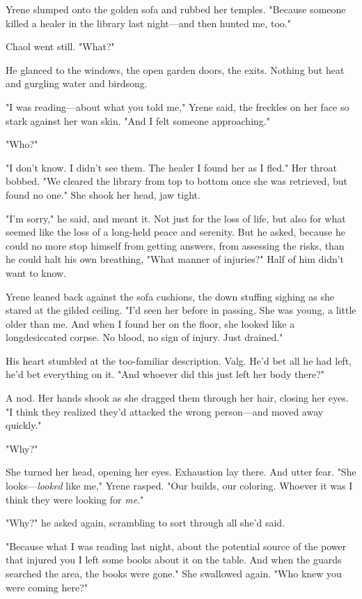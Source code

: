 Yrene slumped onto the golden sofa and rubbed her temples. "Because someone killed a healer in the library last night---and then hunted me, too."

Chaol went still. "What?"

He glanced to the windows, the open garden doors, the exits. Nothing but heat and gurgling water and birdsong.

"I was reading---about what you told me," Yrene said, the freckles on her face so stark against her wan skin. "And I felt someone approaching."

"Who?"

"I don't know. I didn't see them. The healer  I found her as I fled." Her throat bobbed. "We cleared the library from top to bottom once she was  retrieved, but found no one." She shook her head, jaw tight.

"I'm sorry," he said, and meant it. Not just for the loss of life, but also for what seemed like the loss of a long-held peace and serenity. But he asked, because he could no more stop himself from getting answers, from assessing the risks, than he could halt his own breathing, "What manner of injuries?" Half of him didn't want to know.

Yrene leaned back against the sofa cushions, the down stuffing sighing as she stared at the gilded ceiling. "I'd seen her before in passing. She was young, a little older than me. And when I found her on the floor, she looked like a longdesiccated corpse. No blood, no sign of injury. Just  drained."

His heart stumbled at the too-familiar description. Valg. He'd bet all he had left, he'd bet everything on it. "And whoever did this just left her body there?"

A nod. Her hands shook as she dragged them through her hair, closing her eyes. "I think they realized they'd attacked the wrong person---and moved away quickly."

"Why?"

She turned her head, opening her eyes. Exhaustion lay there. And utter fear. "She looks---\emph{looked} like me," Yrene rasped. "Our builds, our coloring. Whoever it was  I think they were looking for
\emph{me}."

"Why?" he asked again, scrambling to sort through all she'd said.

"Because what I was reading last night, about the potential source of the power that injured you  I left some books about it on the table. And when the guards searched the area, the books were gone." She swallowed again. "Who knew you were coming here?"

